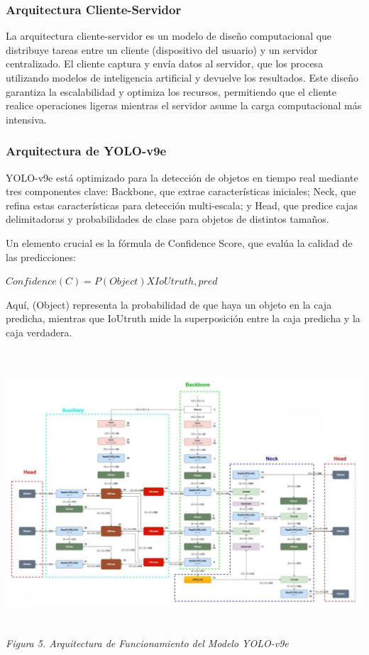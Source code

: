 \documentclass[10pt]{article}
\begin{document}
\subsubsection{Arquitectura Cliente-Servidor}

La arquitectura cliente-servidor es un modelo de diseño computacional que distribuye tareas entre un cliente (dispositivo del usuario) y un servidor centralizado. El cliente captura y envía datos al servidor, que los procesa utilizando modelos de inteligencia artificial y devuelve los resultados. Este diseño garantiza la escalabilidad y optimiza los recursos, permitiendo que el cliente realice operaciones ligeras mientras el servidor asume la carga computacional más intensiva.

\subsubsection{Arquitectura de YOLO-v9e}

YOLO-v9e está optimizado para la detección de objetos en tiempo real mediante tres componentes clave: Backbone, que extrae características iniciales; Neck, que refina estas características para detección multi-escala; y Head, que predice cajas delimitadoras y probabilidades de clase para objetos de distintos tamaños.

\vspace{1\baselineskip}
Un elemento crucial es la fórmula de Confidence Score, que evalúa la calidad de las predicciones:

\( Confidence (C)  =  P(Object) X IoUtruth, pred\)

Aquí, (Object) representa la probabilidad de que haya un objeto en la caja predicha, mientras que IoUtruth mide la superposición entre la caja predicha y la caja verdadera. 

\vspace{1\baselineskip}
\begin{center}
\includegraphics[width=16.51cm,height=10.58cm]{./images/image5.png}
\textit{Figura 5. Arquitectura de Funcionamiento del Modelo YOLO-v9e}
\end{center}
\end{document}
